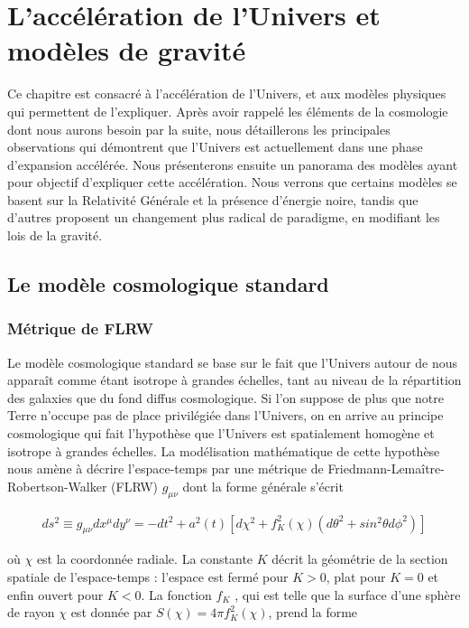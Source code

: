 \documentclass[a4paper,12pt]{report}
\theoremstyle{plain}
\theoremstyle{plain}
\begin{document}
 
  
\chapter{L'acc\'el\'eration de l'Univers et mod\`eles de gravit\'e}\label{chapitre4}
\minitoc


Ce chapitre est consacr\'e \`a l'acc\'el\'eration de l'Univers, et aux mod\`eles physiques qui
permettent de l'expliquer. Apr\`es avoir rappel\'e les \'el\'ements de la cosmologie dont nous 
aurons besoin par la suite, nous d\'etaillerons les principales observations qui d\'emontrent que
l'Univers est actuellement dans une phase d'expansion acc\'el\'er\'ee. Nous pr\'esenterons ensuite
un panorama des mod\`eles ayant pour objectif d'expliquer cette acc\'el\'eration. Nous verrons
que certains mod\`eles se basent sur la Relativit\'e G\'en\'erale et la pr\'esence d'\'energie noire,
tandis que d'autres proposent un changement plus radical de paradigme, en modifiant les
lois de la gravit\'e.
\section{Le mod\`ele cosmologique standard}

\subsection{M\'etrique de FLRW }
Le mod\`ele cosmologique standard se base sur le fait que l'Univers autour de nous
appara\^it comme \'etant isotrope \`a grandes \'echelles, tant au niveau de la r\'epartition des
galaxies que du fond diffus cosmologique. Si l'on suppose de plus que notre Terre n'occupe
pas de place privil\'egi\'ee dans l'Univers, on en arrive au principe cosmologique qui fait
l'hypoth\`ese que l'Univers est spatialement homog\`ene et isotrope \`a grandes \'echelles.
La mod\'elisation math\'ematique de cette hypoth\`ese nous am\`ene \`a d\'ecrire l'espace-temps
par une m\'etrique de Friedmann-Lema\^itre-Robertson-Walker (FLRW) $ g_{\mu \nu} $ dont la forme
g\'en\'erale \cite{215, 277, 282} s'\'ecrit

\begin{eqnarray}
 ds^2 \equiv g_{ \mu \nu } dx^\mu dy^\nu = - dt^2  + a^2(t)[ d\chi^2 + f^2_K(\chi)(d\theta^2 + sin^2 \theta d\phi^2 ) ] \label{gene1} 
\end{eqnarray}

o\`u $ \chi $ est la coordonn\'ee radiale. La constante $K$ d\'ecrit la g\'eom\'etrie de la section spatiale
de l'espace-temps : l'espace est ferm\'e pour $ K > 0$, plat pour $K = 0$ et enfin ouvert pour
$K < 0$. La fonction $  f_K $ , qui est telle que la surface d'une sph\`ere de rayon $ \chi $ est donn\'ee par
    $ S(\chi ) = 4 \pi f_K^2(\chi) $, prend la forme 
   
\end{document}
